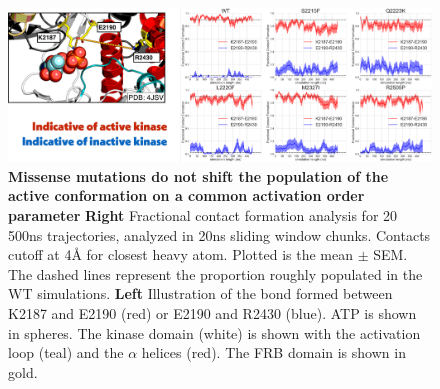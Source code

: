 \documentclass[phd,tocprelim]{cornell}
\begin{document}
\begin{landscape}
	\begin{figure}[p]
		\centering
		\includegraphics[width=1.0\linewidth]{figures/mtor-fig5.pdf}
		\caption[Missense mutations do not shift the population of the active conformation on a common activation order parameter]{
			{\bf Missense mutations do not shift the population of the active conformation on a common activation order parameter}
			{\bf Right} Fractional contact formation analysis for 20 500ns trajectories, analyzed in 20ns sliding window chunks. Contacts cutoff at 4Å for closest heavy atom.  Plotted is the mean $\pm$ SEM. The dashed lines represent the proportion roughly populated in the WT simulations. {\bf Left} Illustration of the bond formed between K2187 and E2190 (red) or E2190 and R2430 (blue). ATP is shown in spheres. The kinase domain (white) is shown with the activation loop (teal) and the $\alpha$ helices (red). The FRB domain is shown in gold. 
		}
		\label{fig:mtor-figure5}
	\end{figure}
\end{landscape}
\end{document}
